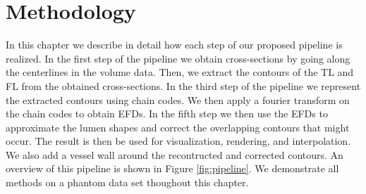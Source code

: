 \documentclass[thesis.tex]{subfiles}
\begin{document}
\chapter{Methodology}\label{chap:basics}

In this chapter we describe in detail how each step of our proposed pipeline is realized. In the first step of the pipeline we obtain cross-sections by going along the centerlines in the volume data. Then, we extract the contours of the TL and FL from the obtained cross-sections. In the third step of the pipeline we represent the extracted contours using chain codes. We then apply a fourier transform on the chain codes to obtain EFDs. In the fifth step we then use the EFDs to approximate the lumen shapes and correct the overlapping contours that might occur. The result is then be used for visualization, rendering, and interpolation. We also add a vessel wall around the recontructed and corrected contours. An overview of this pipeline is shown in Figure \ref{fig:pipeline}. We demonstrate all methods on a phantom data set thoughout this chapter. 

\begin{center}
\end{center}
\end{document}
